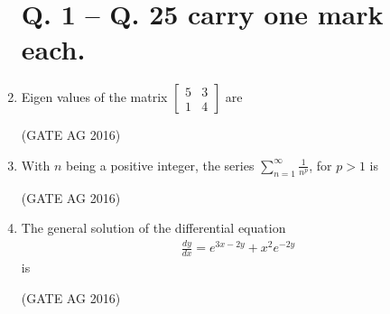 \documentclass[journal]{IEEEtran}
\begin{document}
\begin{enumerate}
\section*{Q. 1 -- Q. 25 carry one mark each.}

\item 
Eigen values of the matrix
$\begin{bmatrix} 5 & 3 \\ 1 & 4 \end{bmatrix}$ are
\begin{enumerate}
\end{enumerate}
\hfill(GATE AG 2016)\\

\medskip

\item 
With $n$ being a positive integer, the series $\sum_{n=1}^{\infty} \frac{1}{n^p}$, for $p > 1$ is
\begin{enumerate}
\end{enumerate}
\hfill(GATE AG 2016)\\

\medskip

\item 
The general solution of the differential equation
\begin{align}
\frac{dy}{dx} = e^{3x-2y} + x^2 e^{-2y}
\end{align}
is
\begin{enumerate}
\end{enumerate}
\hfill(GATE AG 2016)\\


\end{enumerate}
\end{document}
